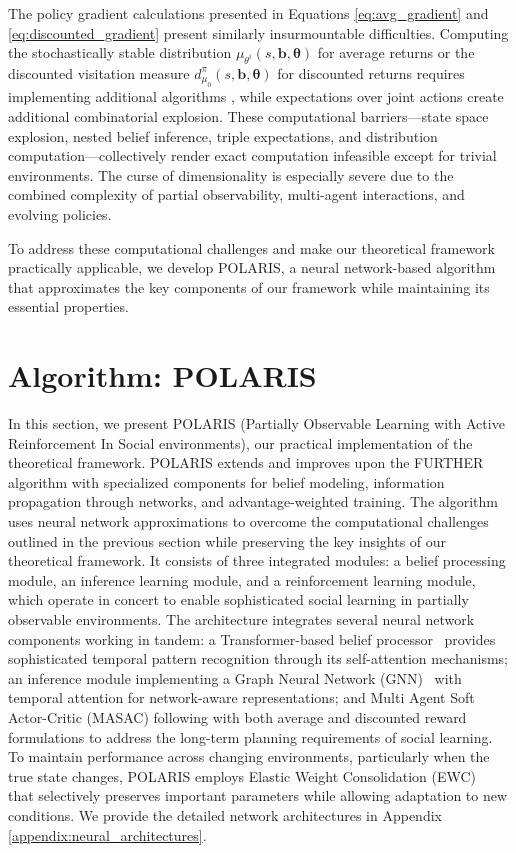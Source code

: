 The policy gradient calculations presented in Equations \eqref{eq:avg_gradient} and \eqref{eq:discounted_gradient} present similarly insurmountable difficulties. Computing the stochastically stable distribution $\mu_{\theta^i}(s, \boldsymbol{b}, \boldsymbol{\theta})$ for average returns or the discounted visitation measure $d^{\pi}_{\mu_0}(s, \boldsymbol{b}, \boldsymbol{\theta})$ for discounted returns requires implementing additional algorithms \citep{wicks2012algorithmcomputingstochasticallystable}, while expectations over joint actions create additional combinatorial explosion. These computational barriers—state space explosion, nested belief inference, triple expectations, and distribution computation—collectively render exact computation infeasible except for trivial environments. The curse of dimensionality is especially severe due to the combined complexity of partial observability, multi-agent interactions, and evolving policies. 

To address these computational challenges and make our theoretical framework practically applicable, we develop POLARIS, a neural network-based algorithm that approximates the key components of our framework while maintaining its essential properties.

\section{Algorithm: POLARIS}

In this section, we present POLARIS (Partially Observable Learning with Active Reinforcement In Social environments), our practical implementation of the theoretical framework. POLARIS extends and improves upon the FURTHER algorithm \cite{kim2022influencing} with specialized components for belief modeling, information propagation through networks, and advantage-weighted training. The algorithm uses neural network approximations to overcome the computational challenges outlined in the previous section while preserving the key insights of our theoretical framework. It consists of three integrated modules: a belief processing module, an inference learning module, and a reinforcement learning module, which operate in concert to enable sophisticated social learning in partially observable environments. The architecture integrates several neural network components working in tandem: a Transformer-based belief processor~\cite{vaswani2017attention} provides sophisticated temporal pattern recognition through its self-attention mechanisms; an inference module implementing a Graph Neural Network (GNN)~\cite{scarselli2009graph} with temporal attention for network-aware representations; and Multi Agent Soft Actor-Critic (MASAC) following \citet{kim2022influencing} with both average and discounted reward formulations to address the long-term planning requirements of social learning. To maintain performance across changing environments, particularly when the true state changes, POLARIS employs Elastic Weight Consolidation (EWC)~\cite{kirkpatrick2017overcoming} that selectively preserves important parameters while allowing adaptation to new conditions. We provide the detailed network architectures in Appendix \ref{appendix:neural_architectures}.

